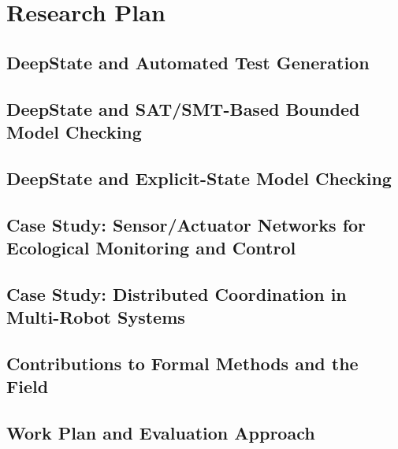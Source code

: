 \section{Research Plan}

%

\subsection{DeepState and Automated Test Generation}
\label{sec:framac2deepstate}


\subsection{DeepState and SAT/SMT-Based Bounded Model Checking}


\subsection{DeepState and Explicit-State Model Checking}



\subsection{Case Study: Sensor/Actuator Networks for Ecological Monitoring and Control}
\label{sec:case-study}


\subsection{Case Study: Distributed Coordination in Multi-Robot Systems}
\label{sec:case-study-robots}


\subsection{Contributions to Formal Methods and the Field}
\label{sec:contributions}


\subsection{Work Plan and Evaluation Approach}
\label{sec:workplan}

